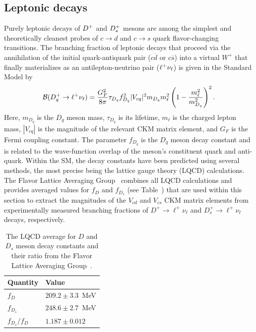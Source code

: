 \subsection{Leptonic decays}

Purely leptonic decays of $D^+$ and $D_{s}^+$ mesons are among the simplest and theoretically cleanest
probes of $c\to d$ and $c\to s$ quark flavor-changing transitions. The branching fraction of leptonic 
decays that proceed via the annihilation of the initial quark-antiquark pair ($c\overline{d}$ or 
$c\overline{s}$) into a virtual $W^+$ that finally materializes as an antilepton-neutrino pair ($\ell^+\nu_{\ell}$) is 
given in the Standard Model by
\begin{equation}
 {\cal B}(D_{q}^+\to \ell^+\nu_{\ell})=\frac{G_F^2}{8\pi}\tau_{D_q}f_{D_{q}}^2|V_{cq}|^2m_{D_{q}}m_{\ell}^2\left(1-\frac{m_{\ell}^2}{m_{D_{q}}^2} \right)^2.
 \label{eq:brCharmLeptonicSM}
\end{equation}
Here, $m_{D_{q}}$ is the $D_{q}$ meson mass, $\tau_{D_q}$ is its lifetime, $m_{\ell}$ is the charged lepton mass, 
$|V_{cq}|$ is the magnitude of the relevant CKM matrix element, and $G_F$ is the Fermi coupling constant. The parameter 
$f_{D_{q}}$ is the $D_q$ meson decay constant and is related to the wave-function overlap of the meson's 
constituent quark and anti-quark. Within the SM, the decay constants have been predicted using several 
methods, the most precise being the lattice gauge theory (LQCD) calculations. The Flavor Lattice Averaging 
Group~\cite{FLAG} combines all LQCD calculations and provides averaged values for $f_D$ and $f_{D_s}$ (see 
Table~\cite{FLAG}) that are used within this section to extract the magnitudes of the $V_{cd}$ and $V_{cs}$ CKM
matrix elements from experimentally measured branching fractions of $D^+\to \ell^+\nu_{\ell}$ and 
$D_s^+\to \ell^+\nu_{\ell}$ decays, respectively.
\begin{table}[b!]
\caption{The LQCD average for $D$ and $D_s$ meson decay constants and their ratio from the Flavor Lattice Averaging 
Group~\cite{FLAG}.
\label{tab:Lattice}}
\begin{center}
\begin{tabular}{ll}
\toprule
\rowcolor{Gray} Quantity & Value \\ 
\midrule
$f_D$ 		& $209.2\pm3.3$~MeV\\
$f_{D_s}$ 	& $248.6\pm2.7$~MeV\\
$f_{D_s}/f_D$	& $1.187\pm0.012$
\\ \bottomrule
\end{tabular}
\end{center}
\end{table}



